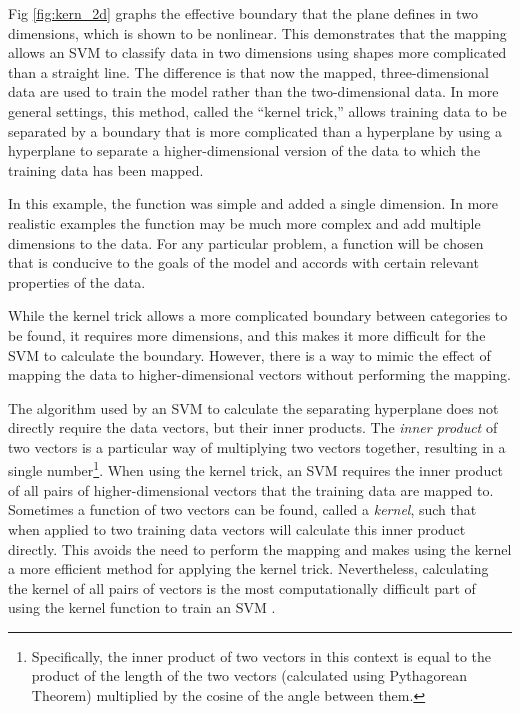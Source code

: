 \documentclass[%
 reprint,
nofootinbib,
 amsmath,amssymb,
 aps,
]{revtex4-2}
\begin{document}
Fig \ref{fig:kern_2d} graphs the effective boundary that the plane defines in two dimensions, which is shown to be nonlinear.
This demonstrates that the mapping allows an SVM to classify data in two dimensions using shapes more complicated than a straight line.
The difference is that now the mapped, three-dimensional data are used to train the model rather than the two-dimensional data.
In more general settings, this method, called the ``kernel trick,'' allows training data to be separated by a boundary that is more complicated than a hyperplane by using a hyperplane to separate a higher-dimensional version of the data to which the training data has been mapped.

In this example, the function was simple and added a single dimension. In more realistic examples the function may be much more complex and add multiple dimensions to the data. For any particular problem, a function will be chosen that is conducive to the goals of the model and accords with certain relevant properties of the data.

While the kernel trick allows a more complicated boundary between categories to be found, it requires more dimensions, and this makes it more difficult for the SVM to calculate the boundary. However, there is a way to mimic the effect of mapping the data to higher-dimensional vectors without performing the mapping. 

The algorithm used by an SVM to calculate the separating hyperplane does not directly require the data vectors, but their inner products. 
The \textit{inner product} of two vectors is a particular way of multiplying two vectors together, resulting in a single number\footnote{Specifically, the inner product of two vectors in this context is equal to the product of the length of the two vectors (calculated using Pythagorean Theorem) multiplied by the cosine of the angle between them.}.
When using the kernel trick, an SVM requires the inner product of all pairs of higher-dimensional vectors that the training data are mapped to.
Sometimes a function of two vectors can be found, called a \textit{kernel}, such that when applied to two training data vectors will calculate this inner product directly. This avoids the need to perform the mapping and makes using the kernel a more efficient method for applying the kernel trick. Nevertheless, calculating the kernel of all pairs of vectors is the most computationally difficult part of using the kernel function to train an SVM \cite{russo_quantum_2023}. 
\end{document}
